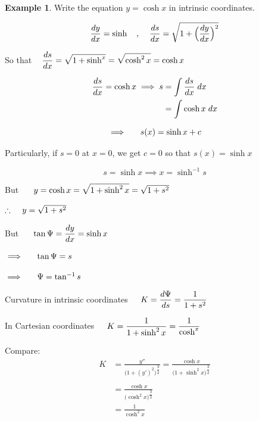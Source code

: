 \documentclass[11pt,a4paper]{article}
\theoremstyle{definition}
\newtheorem{exa}[thm]{Example}
\begin{document}
\begin{exa}


Write the equation $y = \cosh x$ in intrinsic coordinates.

$$\dfrac{dy}{dx} = \sinh\hspace{0.4cm} , \hspace{0.4cm} \frac{ds}{dx} = \sqrt{1 + \Big(\dfrac{dy}{dx}\Big)^2}$$

So that $\hspace{0.3cm}\displaystyle{\frac{ds}{dx} = \sqrt{1 + \sinh^x}=\sqrt{\cosh^2x}=\cosh x}$

\begin{align*}
\frac{ds}{dx} =\cosh x \implies s & = \int \frac{ds}{dx}\hspace{0.1cm}dx \\
& = \int \cosh x\hspace{0.1cm}dx
\end{align*}

$$\implies\hspace{0.5cm} s(x) = \sinh x + c$$

Particularly, if $s = 0$ at $x = 0$, we get $c = 0$ so that $s(x) = \sinh x$

$$s = \sinh x \implies x = \sinh^{-1}s$$


But $\hspace{0.5cm} y = \cosh x = \sqrt{1 + \sinh^2x} = \sqrt{1 + s^2}$


$\therefore\hspace{0.4cm} y = \sqrt{1 + s^2}$


But $\hspace{0.5cm} \tan \Psi = \dfrac{dy}{dx} = \sinh x$


$\implies\hspace{0.5cm} \tan \Psi  = s$


$\implies\hspace{0.5cm} \Psi  = \tan^{-1}s$


Curvature in intrinsic coordinates $\hspace{0.4cm}\displaystyle{ K = \frac{d\Psi}{ds} = \frac{1}{1 + s^2}}$


In Cartesian coordinates $\hspace{0.4cm}\displaystyle{ K = \frac{1}{1 + \sinh^2x} = \frac{1}{\cosh^x}}$


Compare:
\begin{align*}
K & = \frac{y''}{\Big(1 + (y')^2\Big)^{\dfrac{3}{2}}} = \frac{\cosh x}{\Big(1 + \sinh^2x\Big)^{\dfrac{3}{2}}}\\\\
& = \frac{\cosh x}{\Big(\cosh^2x\Big)^{\dfrac{3}{2}}}\\
& = \frac{1}{\cosh^2x}
\end{align*}

\pagebreak
\end{exa}
\end{document}
